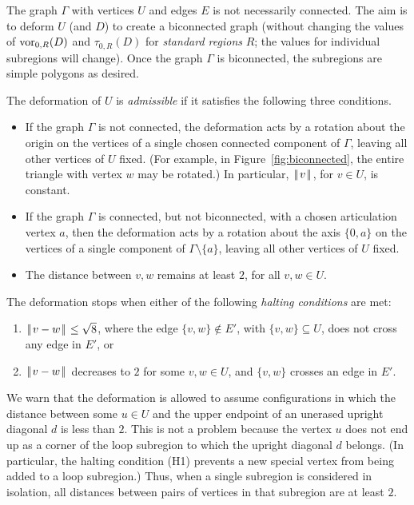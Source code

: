 \documentclass[11pt]{amsart}
\def\op#1{{\text{#1}}}
\def\text{\hbox}
\def\|{{\hskip0.1em|\hskip-0.15em|\hskip0.1em}}
\let\subset=\subseteq
\begin{document}
The graph $\Gamma$ with vertices $U$ and edges $E$ is not necessarily connected.  The aim is to deform
$U$ (and $D$) to create a biconnected graph (without changing the values of $\op{vor}_{0,R}(D)$ and $\tau_{0,R}(D)$ for {\it standard regions} $R$; the values for individual subregions will change).  Once the graph $\Gamma$
is biconnected, the subregions are simple polygons as desired.

The deformation of $U$ is {\it admissible} if it satisfies the following three conditions.
\begin{itemize}
\item If the graph $\Gamma$ is not connected,
the deformation acts by a rotation about the origin 
on the vertices of a single chosen connected component of $\Gamma$,
leaving all other vertices of $U$ fixed.  (For example, in Figure~\ref{fig:biconnected}, the entire triangle with vertex $w$ may be rotated.)  In particular,
$\|v\|$, for $v\in U$, is constant.
\item If the graph $\Gamma$ is connected, but not biconnected, with a chosen articulation vertex $a$, then
the deformation acts by a rotation about the axis $\{0,a\}$ on the vertices of a single component of $\Gamma\setminus\{a\}$,
leaving all other vertices of $U$ fixed.
\item The distance between $v,w$ remains at least $2$, for all $v,w\in U$.
\end{itemize}

The deformation stops when either of the following {\it halting conditions} are met:
{
\renewcommand{\labelenumi}{(H{\theenumi})}
\begin{enumerate}
\item $\|v-w\|\le\sqrt8$, where the edge $\{v,w\}\not\in E'$, with $\{v,w\}\subset U$, does not cross any edge in $E'$, or
\item $\|v-w\|$ decreases to $2$ for some $v,w\in U$, and $\{v,w\}$ crosses an edge in $E'$.
\end{enumerate}
}

We warn that the deformation is allowed to assume configurations in which the distance between some $u\in U$ and the upper endpoint of an unerased upright diagonal $d$ is less than $2$.  This is not a problem because the vertex $u$ does not end up as a corner of the loop subregion to which the upright diagonal $d$ belongs.  (In particular, the halting condition (H1) prevents a new special vertex from being added to a loop subregion.) Thus, when a single subregion is considered in isolation, all distances between pairs of vertices in that subregion are at least $2$.
\end{document}
